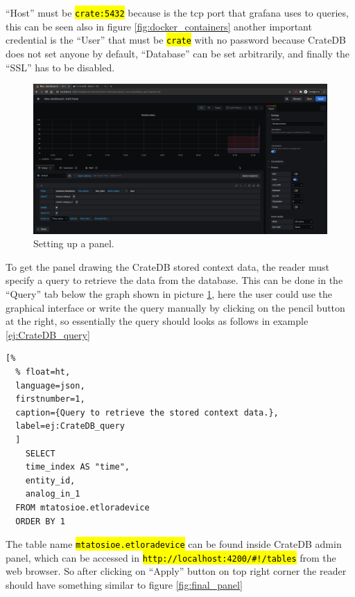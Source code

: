\documentclass[11pt,a4paper,dvipsnames,twoside]{article}
\newcommand{\cmd}[1] {\hl{\texttt{#1}}}
\begin{document}
\enquote{Host} must be \cmd{crate:5432} because is the tcp port that grafana uses to queries, this can be seen also in figure \ref{fig:docker_containers} another important credential is the \enquote{User} that must be \cmd{crate} with no password because CrateDB does not set anyone by default, \enquote{Database} can be set arbitrarily, and finally the \enquote{SSL} has to be disabled. 

\begin{figure}[ht]
  \centering
  \includegraphics[width=.9\textwidth]{../pictures/Grafana_panel_setup.png}
  \caption{Setting up a panel.}
  \label{fig:panel_setup}
\end{figure}

To get the panel drawing the CrateDB stored context data, the reader must specify a query to retrieve the data from the database. This can be done in the \enquote{Query} tab below the graph shown in picture \ref{fig:panel_setup}, here the user could use the graphical interface or write the query manually by clicking on the pencil button at the right, so essentially the query should looks as follows in example \ref{ej:CrateDB_query}

\begin{lstlisting}[%
  % float=ht,
  language=json,
  firstnumber=1,
  caption={Query to retrieve the stored context data.},
  label=ej:CrateDB_query
  ]
    SELECT
    time_index AS "time",
    entity_id,
    analog_in_1
  FROM mtatosioe.etloradevice
  ORDER BY 1
\end{lstlisting}

The table name \cmd{mtatosioe.etloradevice} can be found inside CrateDB admin panel, which can be accessed in \cmd{http://localhost:4200/\#!/tables} from the web browser. So after clicking on \enquote{Apply} button on top right corner the reader should have something similar to figure \ref{fig:final_panel}
\end{document}
